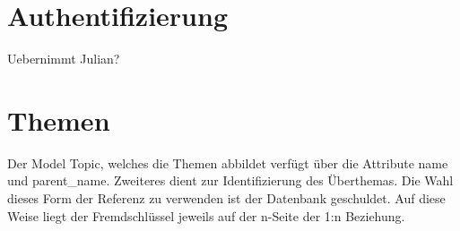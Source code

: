 \section{Authentifizierung}
\begin{k}
Uebernimmt Julian?
\end{k}

\section{Themen}
Der Model Topic, welches die Themen abbildet verfügt über die Attribute name und
parent\_name. Zweiteres dient zur Identifizierung des Überthemas. Die Wahl
dieses Form der Referenz zu verwenden ist der Datenbank geschuldet. Auf diese Weise
liegt der Fremdschlüssel jeweils auf der n-Seite der 1:n Beziehung.